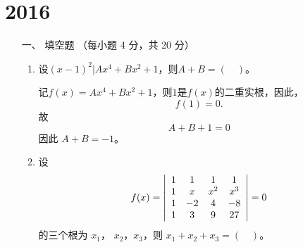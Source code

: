 \section{2016}
\begin{enumerate}[1~]
\renewcommand{\labelenumi}{\textbf{\theenumi. }}
\renewcommand{\Im}{\text{Im }}
\item[一、]
填空题 （每小题 4 分，共 20 分）
\begin{enumerate}[1.~]
\item
设$(x-1)^2|Ax^4+Bx^2+1$，则$A+B=(\quad)$。
\begin{solution}
记$f(x)=Ax^4+Bx^2+1$，则$1$是$f(x)$的二重实根，因此，\[
f(1)=0.
\]
故\[
	A+B+1=0
\]
因此 $A+B=-1$。
\end{solution}

\item 
设
$$
f ( x ) = \left| \begin{array} { c c c c } { 1 } & { 1 } & { 1 } & { 1 } \\ { 1 } & { x } & { x ^ { 2 } } & { x ^ { 3 } } \\ { 1 } & { - 2 } & { 4 } & { - 8 } \\ { 1 } & { 3 } & { 9 } & { 27 } \end{array} \right| = 0
$$
的三个根为 $x_1$， $x_2$，$x_3$，则 $x_1+x_2+x_3=(\quad)$。


\end{enumerate}
\end{enumerate}
